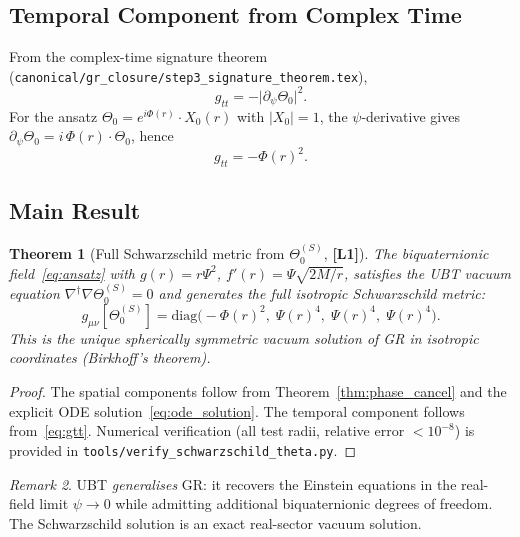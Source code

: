 \documentclass[11pt,a4paper]{article}
\newtheorem{theorem}{Theorem}[section]
\theoremstyle{definition}
\theoremstyle{remark}
\newtheorem{remark}[theorem]{Remark}
\newcommand{\Lone}{\textbf{[L1]}}
\begin{document}
\subsection{Temporal Component from Complex Time}

From the complex-time signature theorem
(\texttt{canonical/gr\_closure/step3\_signature\_theorem.tex}),
\begin{equation}
  g_{tt} = -\bigl|\partial_\psi\Theta_0\bigr|^2.
  \label{eq:gtt_formula}
\end{equation}
For the ansatz $\Theta_0 = e^{i\Phi(r)}\cdot X_0(r)$ with $|X_0| = 1$,
the $\psi$-derivative gives $\partial_\psi\Theta_0 = i\,\Phi(r)\cdot\Theta_0$,
hence
\begin{equation}
  g_{tt} = -\Phi(r)^2.
  \label{eq:gtt}
\end{equation}

\subsection{Main Result}

\begin{theorem}[Full Schwarzschild metric from $\Theta_0^{(S)}$, \Lone]
\label{thm:schwarzschild}
The biquaternionic field~\eqref{eq:ansatz} with $g(r) = r\Psi^2$,
$f'(r) = \Psi\sqrt{2M/r}$, satisfies the UBT vacuum equation
$\nabla^\dagger\nabla\Theta_0^{(S)} = 0$ and generates the full isotropic
Schwarzschild metric:
\begin{equation}
  g_{\mu\nu}[\Theta_0^{(S)}]
  = \mathrm{diag}\!\bigl(-\Phi(r)^2,\;\Psi(r)^4,\;\Psi(r)^4,\;\Psi(r)^4\bigr).
  \label{eq:schwarz_full}
\end{equation}
This is the unique spherically symmetric vacuum solution of GR in isotropic
coordinates (Birkhoff's theorem).
\end{theorem}

\begin{proof}
The spatial components follow from Theorem~\ref{thm:phase_cancel} and
the explicit ODE solution~\eqref{eq:ode_solution}.  The temporal component
follows from~\eqref{eq:gtt}.  Numerical verification (all test radii,
relative error $< 10^{-8}$) is provided in
\texttt{tools/verify\_schwarzschild\_theta.py}.
\end{proof}

\begin{remark}
UBT \emph{generalises} GR: it recovers the Einstein equations in the
real-field limit $\psi \to 0$ while admitting additional biquaternionic
degrees of freedom.  The Schwarzschild solution is an exact real-sector
vacuum solution.
\end{remark}
\end{document}
